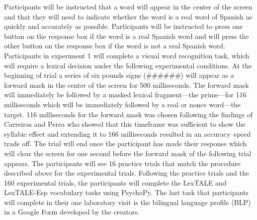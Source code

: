 Participants will be instructed that a word will appear in the center of the screen and that they will need to indicate whether the word is a real word of Spanish as quickly and accurately as possible. Participants will be instructed to press one button on the response box if the word is a real Spanish word and will press the other button on the response box if the word is not a real Spanish word. Participants in experiment 1 will complete a visual word recognition task, which will require a lexical decision under the following experimental conditions. At the beginning of trial a series of six pounds signs (\#\#\#\#\#\#) will appear as a forward mask in the center of the screen for 500 milliseconds. The forward mask will immediately be followed by a masked lexical fragment—the prime—for 116 milliseconds which will be immediately followed by a real or nonce word—the target. 116 milliseconds for the forward mask was chosen following the findings of Carreiras and Perea \parencite*{Carreiras2002-mp} who showed that this timeframe was sufficient to show the syllabic effect and extending it to 166 milliseconds resulted in an accuracy–speed trade off. The trial will end once the participant has made their response which will clear the screen for one second before the forward mask of the following trial appears. The participants will see 16 practice trials that match the procedure described above for the experimental trials. Following the practice trials and the 160 experimental trials, the participants will complete the LexTALE and LexTALE-Esp vocabulary tasks using PsychoPy. The last task that participants will complete in their one laboratory visit is the bilingual language profile (BLP) in a Google Form developed by the creators.






